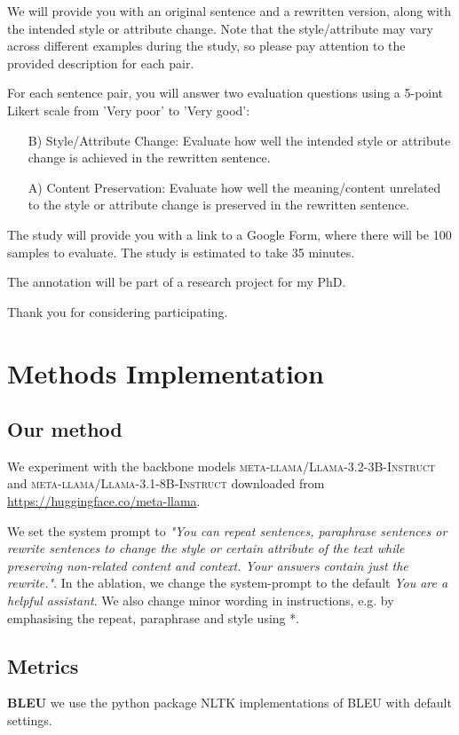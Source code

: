 We will provide you with an original sentence and a rewritten version, along with the intended style or attribute change. Note that the style/attribute may vary across different examples during the study, so please pay attention to the provided description for each pair.

For each sentence pair, you will answer two evaluation questions using a 5-point Likert scale from 'Very poor' to 'Very good':
\begin{itemize}
    \item [B)] Style/Attribute Change: Evaluate how well the intended style or attribute change is achieved in the rewritten sentence.
    \item [A)] Content Preservation: Evaluate how well the meaning/content unrelated to the style or attribute change is preserved in the rewritten sentence.
\end{itemize}
The study will provide you with a link to a Google Form, where there will be 100 samples to evaluate. The study is estimated to take 35 minutes.

The annotation will be part of a research project for my PhD.

Thank you for considering participating. 

\section{Methods Implementation}
\label{app:method}
\subsection{Our method}
We experiment with the backbone models
 \textsc{meta-llama/Llama-3.2-3B-Instruct} and \textsc{meta-llama/Llama-3.1-8B-Instruct} downloaded from \url{https://huggingface.co/meta-llama}. 
 
 We set the system prompt to \textit{"You can repeat sentences, paraphrase sentences or rewrite sentences to change the style or certain attribute of the text while preserving non-related content and context. Your answers contain just the rewrite."}. In the ablation, we change the system-prompt to the default \textit{You are a helpful assistant}. We also change minor wording in instructions, e.g. by emphasising the repeat, paraphrase and style using *.
 
\subsection{Metrics}
\textbf{BLEU} \cite{papineni-etal-2002-bleu} we use the python package NLTK implementations of BLEU with default settings.

